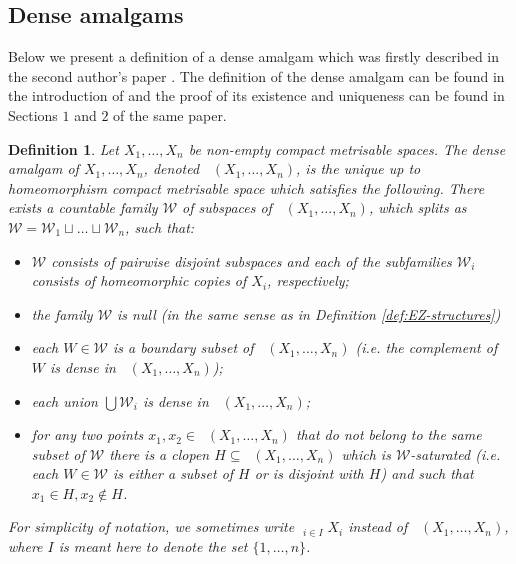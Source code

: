 \documentclass[12pt, a4paper]{article}
\newcommand{\8}{\infty}
\theoremstyle{break}
\theoremstyle{defbreak}
\newtheorem{df}[thm]{Definition}
\DeclareMathOperator*{\damalgam}{\widetilde{\bigsqcup}}
\begin{document}

\subsection{Dense amalgams}\label{Subsection:dense_amalgams}

Below we present a definition of a dense amalgam which was firstly described in the second author's paper \cite{dense-amalgam}. The definition of the dense amalgam can be found in the introduction of \cite{dense-amalgam} and the proof of its existence and uniqueness can be found in Sections $1$ and $2$ of the same paper.\medskip

\begin{df} \label{Definition:dense_amalgam}
    Let $X_1,\ldots, X_n$ be non-empty compact metrisable spaces. \textit{The dense amalgam} of $X_1, \ldots, X_n$, denoted $\damalgam(X_1,\ldots,X_n)$, is the unique up to homeomorphism compact metrisable space which satisfies the following.
    There exists a countable family $\mathcal{W}$ of subspaces of $\damalgam(X_1,\ldots,X_n)$, which splits as $\mathcal{W} = \mathcal{W}_1\sqcup \ldots \sqcup \mathcal{W}_n$, such that:
    \begin{itemize}
        \item[(a1)] $\mathcal{W}$ consists of pairwise disjoint subspaces 
        and each of the subfamilies $\mathcal{W}_i$ consists of homeomorphic copies of $X_i$, respectively;
        \item[(a2)] the family $\mathcal{W}$ is null (in the same sense as in Definition \ref{def:EZ-structures})
        \item[(a3)] each $W\in \mathcal{W}$ is a boundary subset of $\damalgam(X_1,\ldots,X_n)$ (i.e. the complement of $W$ is dense in $\damalgam(X_1,\ldots,X_n)$);
        \item[(a4)] each union $\bigcup \mathcal{W}_i$ is dense in $\damalgam(X_1,\ldots,X_n)$;
        \item[(a5)] for any two points $x_1, x_2\in \damalgam(X_1,\ldots,X_n)$ that do not belong to the same subset of $\mathcal{W}$ there is a clopen $H\subseteq\damalgam(X_1,\ldots,X_n)$ which is \textit{$\mathcal{W}$-saturated} (i.e. each $W\in \mathcal{W}$ is either a subset of $H$ or is disjoint with $H$) and such that $x_1\in H, x_2\not\in H$.
    \end{itemize}
    For simplicity of notation, we sometimes write $\damalgam_{i\in I}X_i$ instead of $\damalgam(X_1, \ldots, X_n)$, where $I$ is meant here to denote the set $\{ 1,\dots,n \}$.
\end{df}
\end{document}
